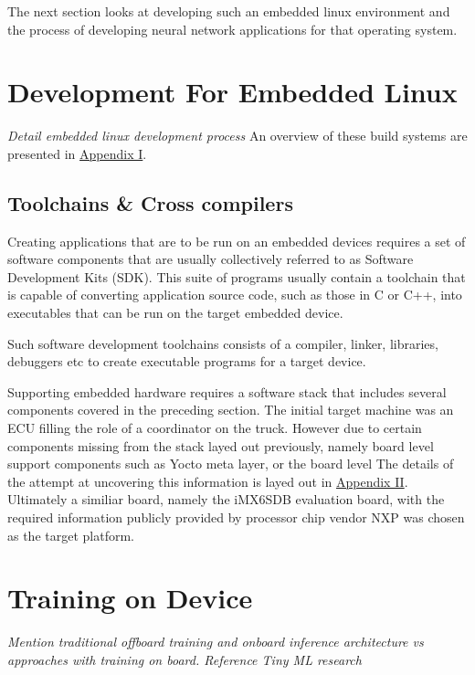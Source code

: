 The next section looks at developing such an embedded linux environment and the process of developing neural network applications for that operating system.

\section[Development Process for Embedded Linux]{Development For Embedded Linux}
\textit{Detail embedded linux development process}
An overview of these build systems are presented in \hyperref[buildsystems]{Appendix I}.

\subsection[SDKs \& Compiler Toolchains]{Toolchains \& Cross compilers}

Creating applications that are to be run on an embedded devices requires a set of software components that are usually collectively referred to as Software Development Kits (SDK). This suite of programs usually contain a toolchain that is capable of converting application source code, such as those in C or C++, into executables that can be run on the target embedded device.

Such software development toolchains consists of a compiler, linker, libraries, debuggers etc to create executable programs for a target device.

Supporting embedded hardware requires a software stack that includes several components covered in the preceding section. The initial target machine was an ECU filling the role of a coordinator on the truck. However due to certain components missing from the stack layed out previously, namely board level support components such as Yocto meta layer, or the board level The details of the attempt at uncovering this information is layed out in \hyperref[rtc-c300]{Appendix II}. Ultimately a similiar board, namely the iMX6SDB evaluation board, with the required information publicly provided by processor chip vendor NXP was chosen as the target platform.

\section{Training on Device}

\textit{Mention traditional offboard training and onboard inference architecture vs approaches with training on board. Reference Tiny ML research}

